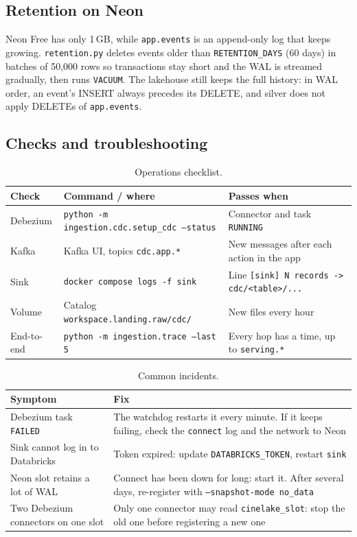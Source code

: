 \documentclass[12pt,a4paper]{article}
\newcommand{\code}[1]{\texttt{#1}}
\begin{document}
\subsection{Retention on Neon}
Neon Free has only 1\,GB, while \code{app.events} is an append-only log that keeps growing. \code{retention.py}
deletes events older than \code{RETENTION\_DAYS} (60 days) in batches of 50,000 rows so transactions stay short and
the WAL is streamed gradually, then runs \code{VACUUM}. The lakehouse still keeps the full history: in WAL order, an
event's INSERT always precedes its DELETE, and silver does not apply DELETEs of \code{app.events}.

\subsection{Checks and troubleshooting}
\begin{table}[H]
\centering\small
\begin{tabularx}{\textwidth}{@{}lXX@{}}
\toprule
Check & Command / where & Passes when \\
\midrule
Debezium & \code{python -m ingestion.cdc.setup\_cdc --status} & Connector and task \code{RUNNING} \\
Kafka & Kafka UI, topics \code{cdc.app.*} & New messages after each action in the app \\
Sink & \code{docker compose logs -f sink} & Line \code{[sink] N records -> cdc/<table>/...} \\
Volume & Catalog \code{workspace.landing.raw/cdc/} & New files every hour \\
End-to-end & \code{python -m ingestion.trace --last 5} & Every hop has a time, up to \code{serving.*} \\
\bottomrule
\end{tabularx}
\caption{Operations checklist.}
\end{table}

\begin{table}[H]
\centering\small
\begin{tabularx}{\textwidth}{@{}XX@{}}
\toprule
Symptom & Fix \\
\midrule
Debezium task \code{FAILED} & The watchdog restarts it every minute. If it keeps failing, check the \code{connect}
log and the network to Neon \\
Sink cannot log in to Databricks & Token expired: update \code{DATABRICKS\_TOKEN}, restart \code{sink} \\
Neon slot retains a lot of WAL & Connect has been down for long: start it. After several days, re-register with
\code{--snapshot-mode no\_data} \\
Two Debezium connectors on one slot & Only one connector may read \code{cinelake\_slot}: stop the old one before
registering a new one \\
\bottomrule
\end{tabularx}
\caption{Common incidents.}
\end{table}
\end{document}

